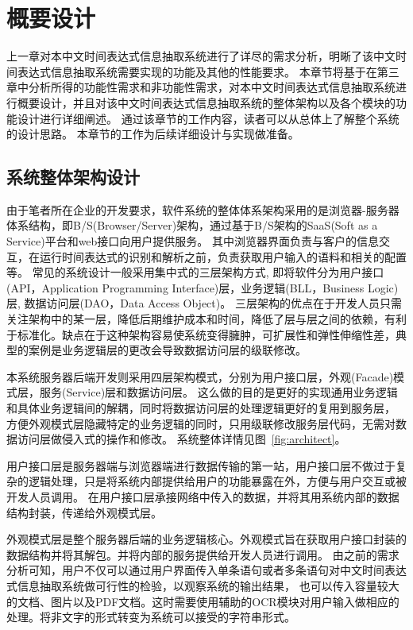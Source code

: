

\chapter{概要设计}

上一章对本中文时间表达式信息抽取系统进行了详尽的需求分析，明晰了该中文时间表达式信息抽取系统需要实现的功能及其他的性能要求。
本章节将基于在第三章中分析所得的功能性需求和非功能性需求，对本中文时间表达式信息抽取系统进行概要设计，并且对该中文时间表达式信息抽取系统的整体架构以及各个模块的功能设计进行详细阐述。
通过该章节的工作内容，读者可以从总体上了解整个系统的设计思路。
本章节的工作为后续详细设计与实现做准备。

\section{系统整体架构设计}



由于笔者所在企业的开发要求，软件系统的整体体系架构采用的是浏览器-服务器体系结构，即B/S(Browser/Server)架构，通过基于B/S架构的SaaS(Soft as a Service)平台和web接口向用户提供服务。
其中浏览器界面负责与客户的信息交互，在运行时间表达式的识别和解析之前，负责获取用户输入的语料和相关的配置等。
常见的系统设计一般采用集中式的三层架构方式, 即将软件分为用户接口(API，Application Programming Interface)层，业务逻辑(BLL，Business Logic)层, 数据访问层(DAO，Data Access Object)。
三层架构的优点在于开发人员只需关注架构中的某一层，降低后期维护成本和时间，降低了层与层之间的依赖，有利于标准化。缺点在于这种架构容易使系统变得臃肿，可扩展性和弹性伸缩性差，典型的案例是业务逻辑层的更改会导致数据访问层的级联修改。

本系统服务器后端开发则采用四层架构模式，分别为用户接口层，外观(Facade)模式层，服务(Service)层和数据访问层。
这么做的目的是更好的实现通用业务逻辑和具体业务逻辑间的解耦，同时将数据访问层的处理逻辑更好的复用到服务层，
方便外观模式层隐藏特定的业务逻辑的同时，只用级联修改服务层代码，无需对数据访问层做侵入式的操作和修改。
系统整体详情见图~\ref{fig:architect}。

用户接口层是服务器端与浏览器端进行数据传输的第一站，用户接口层不做过于复杂的逻辑处理，只是将系统内部提供给用户的功能暴露在外，方便与用户交互或被开发人员调用。
在用户接口层承接网络中传入的数据，并将其用系统内部的数据结构封装，传递给外观模式层。

外观模式层是整个服务器后端的业务逻辑核心。外观模式旨在获取用户接口封装的数据结构并将其解包。并将内部的服务提供给开发人员进行调用。
由之前的需求分析可知，用户不仅可以通过用户界面传入单条语句或者多条语句对中文时间表达式信息抽取系统做可行性的检验，以观察系统的输出结果，
也可以传入容量较大的文档、图片以及PDF文档。这时需要使用辅助的OCR模块对用户输入做相应的处理。将非文字的形式转变为系统可以接受的字符串形式。


